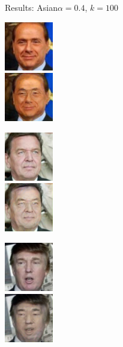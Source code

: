\documentclass[11pt]{beamer}
\begin{document}
\begin{frame}{Results: Asian}{$\alpha=0.4$, $k=100$}
	\centering
	\begin{minipage}{81px}
		\includegraphics[width=80px]{../pictures/outputs/start-imgs/Berlusconi.png}\\
		\includegraphics[width=80px]{../pictures/outputs/asian_alpha0.4_k100/Berlusconi.png}
	\end{minipage}%
	\begin{minipage}{81px}
		\includegraphics[width=80px]{../pictures/outputs/start-imgs/Schroeder.png}\\
		\includegraphics[width=80px]{../pictures/outputs/asian_alpha0.4_k100/Schroeder.png}
	\end{minipage}%
	\begin{minipage}{81px}
		\includegraphics[width=80px]{../pictures/outputs/start-imgs/Trump.png}\\
		\includegraphics[width=80px]{../pictures/outputs/asian_alpha0.4_k100/Trump.png}
	\end{minipage}%

\end{frame}
\end{document}
